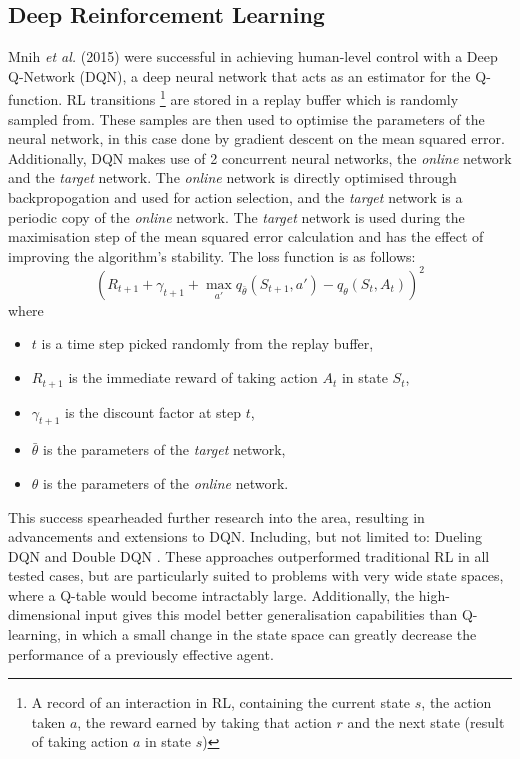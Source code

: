\subsection{Deep Reinforcement Learning}
Mnih \textit{et al.} (2015) \cite{mnih2015human} were successful in achieving human-level control with a Deep Q-Network (DQN), a deep neural network that acts as an estimator for the Q-function. RL transitions \footnote{A record of an interaction in RL, containing the current state $s$, the action taken $a$, the reward earned by taking that action $r$ and the next state (result of taking action $a$ in state $s$)} are stored in a replay buffer which is randomly sampled from. These samples are then used to optimise the parameters of the neural network, in this case done by gradient descent on the mean squared error. Additionally, DQN makes use of 2 concurrent neural networks, the \textit{online} network and the \textit{target} network. The \textit{online} network is directly optimised through backpropogation and used for action selection, and the \textit{target} network is a periodic copy of the \textit{online} network. The \textit{target} network is used during the maximisation step of the mean squared error calculation and has the effect of improving the algorithm's stability. The loss function is as follows:
\[
(R_{t+1} + \gamma_{t+1} + \max_{a'} q_{\bar{\theta}}(S_{t+1}, a') - q_\theta(S_t,A_t))^2
\]
where
\begin{itemize}
    \item $t$ is a time step picked randomly from the replay buffer,
    \item $R_{t+1}$ is the immediate reward of taking action $A_t$ in state $S_t$,
    \item $\gamma_{t+1}$ is the discount factor at step $t$,
    \item $\bar{\theta}$ is the parameters of the \textit{target} network,
    \item $\theta$ is the parameters of the \textit{online} network.
\end{itemize}
This success spearheaded further research into the area, resulting in advancements and extensions to DQN. Including, but not limited to: Dueling DQN \cite{wang2016dueling} and Double DQN \cite{van2016doubleq}. These approaches outperformed traditional RL in all tested cases, but are particularly suited to problems with very wide state spaces, where a Q-table would become intractably large. Additionally, the high-dimensional input gives this model better generalisation capabilities than Q-learning, in which a small change in the state space can greatly decrease the performance of a previously effective agent.